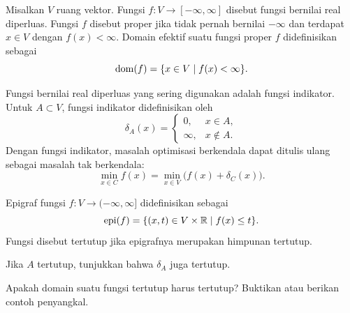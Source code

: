 \begin{defn}
    Misalkan $V$ ruang vektor. Fungsi
    $f:V\rightarrow[-\infty,\infty]$ disebut fungsi bernilai real diperluas.
    Fungsi $f$ disebut proper jika tidak pernah bernilai $-\infty$ dan terdapat
    $x\in V$ dengan $f(x)<\infty$. Domain efektif suatu fungsi proper $f$
    didefinisikan sebagai
    \begin{equation}
        \operatorname{\mathrm{dom}}(f)=\{x\in V\mid f(x)<\infty\}.
    \end{equation}
\end{defn}

\begin{example}
    Fungsi bernilai real diperluas yang sering digunakan adalah fungsi
    indikator. Untuk $A\subset V$, fungsi indikator didefinisikan oleh
    \begin{equation}
        \delta_A(x)=
        \begin{cases}
            0,      &x\in A,\\
            \infty, &x\notin A.
        \end{cases}
    \end{equation}
    Dengan fungsi indikator, masalah optimisasi berkendala dapat ditulis ulang
    sebagai masalah tak berkendala:
    \begin{equation}
        \min_{x\in C}f(x)=\min_{x\in V}\bigl(f(x)+\delta_C(x)\bigr).
    \end{equation}
\end{example}

\begin{defn}
    Epigraf fungsi $f:V\rightarrow(-\infty,\infty]$ didefinisikan sebagai
    \begin{equation}
        \operatorname{\mathrm{epi}}(f)=\{(x,t)\in V\times\mathbb{R}\mid f(x)\leq t\}.
    \end{equation}
    Fungsi disebut tertutup jika epigrafnya merupakan himpunan tertutup.
\end{defn}

\begin{exercise}
    Jika $A$ tertutup, tunjukkan bahwa $\delta_A$ juga tertutup.
\end{exercise}

\begin{exercise}
    Apakah domain suatu fungsi tertutup harus tertutup? Buktikan atau berikan
    contoh penyangkal.
\end{exercise}

